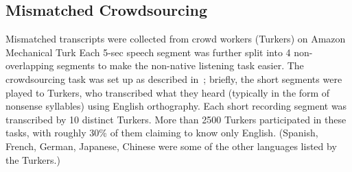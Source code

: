 \subsection{Mismatched Crowdsourcing}
\label{sec:methodsmc}

Mismatched transcripts were collected from crowd workers (Turkers)
on Amazon Mechanical Turk
Each 5-sec speech segment was further split into 4
non-overlapping segments to make the non-native listening task
easier. The crowdsourcing task was set up as described
in~\cite{JHJ15b}; briefly, the short segments were played to Turkers,
who transcribed what they heard (typically in the form of nonsense
syllables) using English orthography. Each short recording segment was
transcribed by 10 distinct Turkers. More than 2500 Turkers
participated in these tasks, with roughly 30\% of them claiming to
know only English. (Spanish, French, German, Japanese, Chinese were
some of the other languages listed by the Turkers.)

